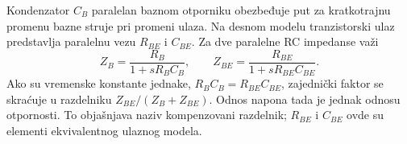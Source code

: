 Kondenzator $C_B$ paralelan baznom otporniku obezbeđuje put za kratkotrajnu promenu bazne struje pri promeni ulaza. Na desnom modelu tranzistorski ulaz predstavlja paralelnu vezu $R_{BE}$ i $C_{BE}$. Za dve paralelne RC impedanse važi
\[Z_B=\frac{R_B}{1+sR_BC_B},\qquad Z_{BE}=\frac{R_{BE}}{1+sR_{BE}C_{BE}}.\]
Ako su vremenske konstante jednake, $R_BC_B=R_{BE}C_{BE}$, zajednički faktor se skraćuje u razdelniku $Z_{BE}/(Z_B+Z_{BE})$. Odnos napona tada je jednak odnosu otpornosti. To objašnjava naziv kompenzovani razdelnik; $R_{BE}$ i $C_{BE}$ ovde su elementi ekvivalentnog ulaznog modela.
